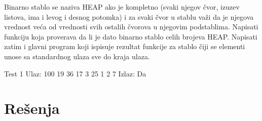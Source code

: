 \begin{Answer}[ref=714]
\end{Answer}


\begin{Exercise}[label=715]
Binarno stablo se naziva HEAP ako je kompletno (svaki njegov čvor, izuzev listova, ima i levog i desnog potomka) i za svaki čvor u stablu važi da je njegova vrednost veća od vrednosti svih ostalih čvorova u njegovim podstablima. Napisati funkciju  koja proverava da li je dato binarno stablo celih brojeva HEAP. Napisati zatim i glavni program koji ispisuje rezultat  funkcije za stablo čiji se elementi unose sa standardnog ulaza sve do kraja ulaza.

\begin{miditest}
\begin{test}{Test 1}
Ulaz: 
100 19 36 17 3 25 1 2 7
Izlaz: 
Da
\end{test}
\end{miditest}

\end{Exercise}

\begin{Answer}[ref=715]
\end{Answer}


\section{Rešenja}
\shipoutAnswer
